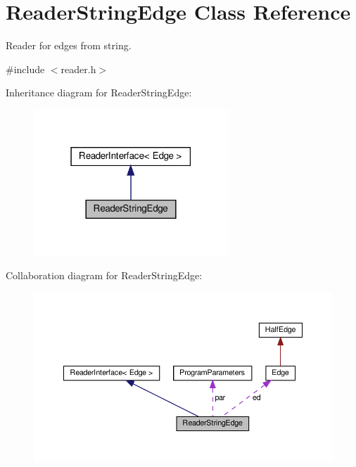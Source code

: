 \hypertarget{classReaderStringEdge}{}\section{Reader\+String\+Edge Class Reference}
\label{classReaderStringEdge}


Reader for edges from string.  




{\ttfamily \#include $<$reader.\+h$>$}



Inheritance diagram for Reader\+String\+Edge\+:
\nopagebreak
\begin{figure}[H]
\begin{center}
\leavevmode
\includegraphics[width=207pt]{classReaderStringEdge__inherit__graph}
\end{center}
\end{figure}


Collaboration diagram for Reader\+String\+Edge\+:
\nopagebreak
\begin{figure}[H]
\begin{center}
\leavevmode
\includegraphics[width=350pt]{classReaderStringEdge__coll__graph}
\end{center}
\end{figure}
